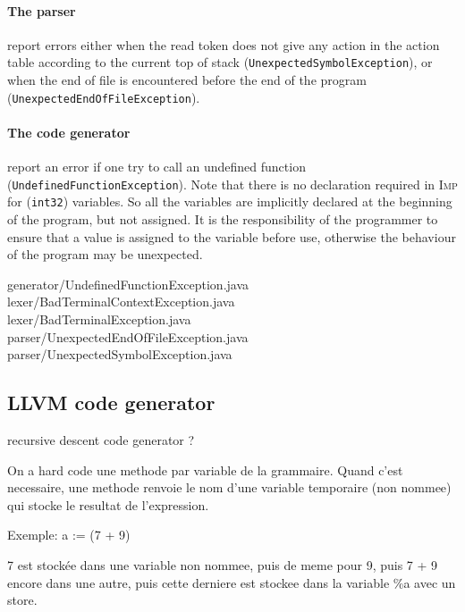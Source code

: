 \documentclass[11pt]{article}
\newcommand\imp{\textsc{Imp}\xspace}
\newcommand\inttt{\texttt{int32}\xspace}
\begin{document}
\paragraph*{The parser} report errors either when the read token does not give any action in the action table
according to the current top of stack (\texttt{UnexpectedSymbolException}),
or when the end of file is encountered before the end of the program (\texttt{UnexpectedEndOfFileException}).

\paragraph*{The code generator} report an error if one try to call an undefined function
(\texttt{UndefinedFunctionException}).
Note that there is no declaration required in \imp for (\inttt) variables.
So all the variables are implicitly declared at the beginning of the program, but not assigned.
It is the responsibility of the programmer to ensure that a value is assigned to the variable before use,
otherwise the behaviour of the program may be unexpected.


{\ttfamily
generator/UndefinedFunctionException.java \\
lexer/BadTerminalContextException.java \\
lexer/BadTerminalException.java \\
parser/UnexpectedEndOfFileException.java \\
parser/UnexpectedSymbolException.java \\
}

\subsection{LLVM code generator}

recursive descent code generator ?

On a hard code une methode par variable de la grammaire.
Quand c'est necessaire, une methode renvoie le nom d'une variable temporaire (non nommee)
qui stocke le resultat de l'expression.

Exemple: a := (7 + 9)

7 est stockée dans une variable non nommee, puis de meme pour 9, puis 7 + 9 encore dans une autre, puis cette derniere est stockee
dans la variable \%a avec un store.
\end{document}
